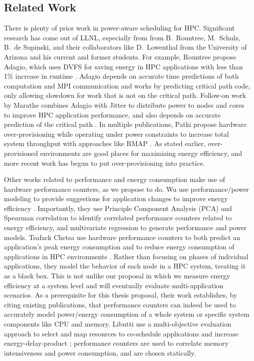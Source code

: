 \subsection{Related Work}
\label{sec:related}


There is plenty of prior work in power-aware scheduling for HPC.
Significant research has come out of LLNL, especially from from B.~Rountree, M.~Schulz, B.~de Supinski, and their collaborators like D.~Lowenthal from the University of Arizona and his current and former students.
For example, Rountree \etal propose Adagio, which uses DVFS for saving energy in HPC applications with less than 1\% increase in runtime \cite{RountreeAdagio}.
Adagio depends on accurate time predictions of both computation and MPI communication and works by predicting critical path code, only allowing slowdown for work that is not on the critical path.
Follow-on work by Marathe \etal combines Adagio with Jitter \cite{Jitter} to distribute power to nodes and cores to improve HPC application performance, and also depends on accurate prediction of the critical path \cite{Marathe2015}.
In multiple publications, Patki \etal propose hardware over-provisioning while operating under power constraints to increase total system throughput with approaches like RMAP \cite{PatkiRMAP}.
As stated earlier, over-provisioned environments are good places for maximizing energy efficiency, and more recent work has begun to put over-provisioning into practice.

Other works related to performance and energy consumption make use of hardware performance counters, as we propose to do.
Wu \etal use performance/power modeling to provide suggestions for application changes to improve energy efficiency \cite{WuHPCComputer}.
Importantly, they use Principle Component Analysis (PCA) and Spearman correlation to identify correlated performance counters related to energy efficiency, and multivariate regression to generate performance and power models.
Tsafack Chetsa \etal use hardware performance counters to both predict an application's peak energy consumption and to reduce energy consumption of applications in HPC environments \cite{Chetsa}.
Rather than focusing on phases of individual applications, they model the behavior of each node in a HPC system, treating it as a black box.
This is not unlike our proposal in which we measure energy efficiency at a system level and will eventually evaluate multi-application scenarios.
As a prerequisite for this thesis proposal, their work establishes, by citing existing publications, that performance counters can indeed be used to accurately model power/energy consumption of a whole system or specific system components like CPU and memory.
Libutti \etal use a multi-objective evaluation approach to select and map resources to co-schedule applications and increase energy-delay-product \cite{Libutti2014}; performance counters are used to correlate memory intensiveness and power consumption, and are chosen statically.

